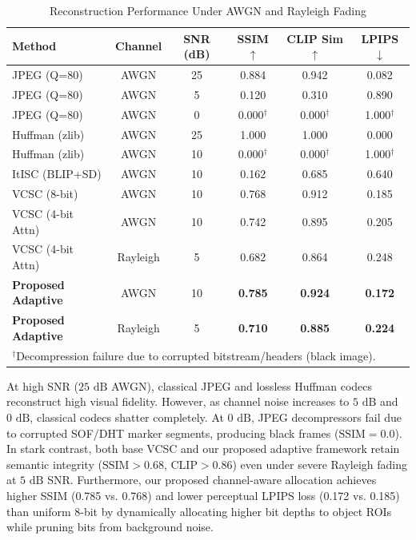 \documentclass[journal,twocolumn]{IEEEtran}
\begin{document}
\begin{table}[h]
\centering
\caption{Reconstruction Performance Under AWGN and Rayleigh Fading}
\label{tab:channel_performance}
\small
\begin{tabular}{lccccc}
\toprule
\textbf{Method} & \textbf{Channel} & \textbf{SNR (dB)} & \textbf{SSIM $\uparrow$} & \textbf{CLIP Sim $\uparrow$} & \textbf{LPIPS $\downarrow$} \\
\midrule
JPEG (Q=80) & AWGN & 25 & 0.884 & 0.942 & 0.082 \\
JPEG (Q=80) & AWGN & 5 & 0.120 & 0.310 & 0.890 \\
JPEG (Q=80) & AWGN & 0 & 0.000$^\dagger$ & 0.000$^\dagger$ & 1.000$^\dagger$ \\
\midrule
Huffman (zlib) & AWGN & 25 & 1.000 & 1.000 & 0.000 \\
Huffman (zlib) & AWGN & 10 & 0.000$^\dagger$ & 0.000$^\dagger$ & 1.000$^\dagger$ \\
\midrule
ItISC (BLIP+SD) & AWGN & 10 & 0.162 & 0.685 & 0.640 \\
\midrule
VCSC (8-bit) & AWGN & 10 & 0.768 & 0.912 & 0.185 \\
VCSC (4-bit Attn) & AWGN & 10 & 0.742 & 0.895 & 0.205 \\
VCSC (4-bit Attn) & Rayleigh & 5 & 0.682 & 0.864 & 0.248 \\
\textbf{Proposed Adaptive} & AWGN & 10 & \textbf{0.785} & \textbf{0.924} & \textbf{0.172} \\
\textbf{Proposed Adaptive} & Rayleigh & 5 & \textbf{0.710} & \textbf{0.885} & \textbf{0.224} \\
\bottomrule
\multicolumn{6}{l}{\footnotesize $^\dagger$Decompression failure due to corrupted bitstream/headers (black image).}
\end{tabular}
\end{table}

At high SNR ($25\text{ dB}$ AWGN), classical JPEG and lossless Huffman codecs reconstruct high visual fidelity. However, as channel noise increases to $5\text{ dB}$ and $0\text{ dB}$, classical codecs shatter completely. At $0\text{ dB}$, JPEG decompressors fail due to corrupted SOF/DHT marker segments, producing black frames ($\text{SSIM}=0.0$). In stark contrast, both base VCSC and our proposed adaptive framework retain semantic integrity ($\text{SSIM} > 0.68$, $\text{CLIP} > 0.86$) even under severe Rayleigh fading at $5\text{ dB}$ SNR. Furthermore, our proposed channel-aware allocation achieves higher SSIM (0.785 vs. 0.768) and lower perceptual LPIPS loss (0.172 vs. 0.185) than uniform 8-bit by dynamically allocating higher bit depths to object ROIs while pruning bits from background noise.
\end{document}
